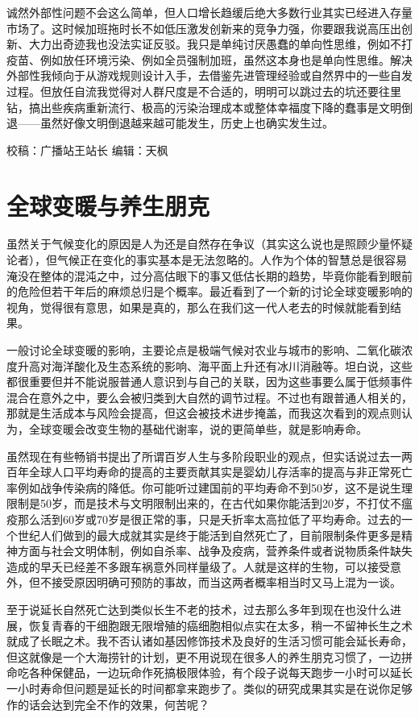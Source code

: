 \documentclass[
]{book}
\begin{document}
诚然外部性问题不会这么简单，但人口增长趋缓后绝大多数行业其实已经进入存量市场了。这时候加班拖时长不如低压激发创新来的竞争力强，你要跟我说高压出创新、大力出奇迹我也没法实证反驳。我只是单纯讨厌愚蠢的单向性思维，例如不打疫苗、例如放任环境污染、例如全员强制加班，虽然这本身也是单向性思维。解决外部性我倾向于从游戏规则设计入手，去借鉴先进管理经验或自然界中的一些自发过程。但放任自流我觉得对人群尺度是不合适的，明明可以跳过去的坑还要往里钻，搞出些疾病重新流行、极高的污染治理成本或整体幸福度下降的蠢事是文明倒退------虽然好像文明倒退越来越可能发生，历史上也确实发生过。

校稿：广播站王站长
编辑：天枫

\hypertarget{ux5168ux7403ux53d8ux6696ux4e0eux517bux751fux670bux514b}{%
\section{全球变暖与养生朋克}\label{ux5168ux7403ux53d8ux6696ux4e0eux517bux751fux670bux514b}}

虽然关于气候变化的原因是人为还是自然存在争议（其实这么说也是照顾少量怀疑论者），但气候正在变化的事实基本是无法忽略的。人作为个体的智慧总是很容易淹没在整体的混沌之中，过分高估眼下的事又低估长期的趋势，毕竟你能看到眼前的危险但若干年后的麻烦总归是个概率。最近看到了一个新的讨论全球变暖影响的视角，觉得很有意思，如果是真的，那么在我们这一代人老去的时候就能看到结果。

一般讨论全球变暖的影响，主要论点是极端气候对农业与城市的影响、二氧化碳浓度升高对海洋酸化及生态系统的影响、海平面上升还有冰川消融等。坦白说，这些都很重要但并不能说服普通人意识到与自己的关联，因为这些事要么属于低频事件混合在意外之中，要么会被归类到大自然的调节过程。不过也有跟普通人相关的，那就是生活成本与风险会提高，但这会被技术进步掩盖，而我这次看到的观点则认为，全球变暖会改变生物的基础代谢率，说的更简单些，就是影响寿命。

虽然现在有些畅销书提出了所谓百岁人生与多阶段职业的观点，但实话说过去一两百年全球人口平均寿命的提高的主要贡献其实是婴幼儿存活率的提高与非正常死亡率例如战争传染病的降低。你可能听过建国前的平均寿命不到50岁，这不是说生理限制是50岁，而是技术与文明限制出来的，在古代如果你能活到20岁，不打仗不瘟疫那么活到60岁或70岁是很正常的事，只是夭折率太高拉低了平均寿命。过去的一个世纪人们做到的最大成就其实是终于能活到自然死亡了，目前限制条件更多是精神方面与社会文明体制，例如自杀率、战争及疫病，营养条件或者说物质条件缺失造成的早夭已经差不多跟车祸意外同样量级了。人就是这样的生物，可以接受意外，但不接受原因明确可预防的事故，而当这两者概率相当时又马上混为一谈。

至于说延长自然死亡达到类似长生不老的技术，过去那么多年到现在也没什么进展，恢复青春的干细胞跟无限增殖的癌细胞相似点实在太多，稍一不留神长生之术就成了长眠之术。我不否认诸如基因修饰技术及良好的生活习惯可能会延长寿命，但这就像是一个大海捞针的计划，更不用说现在很多人的养生朋克习惯了，一边拼命吃各种保健品，一边玩命作死搞极限体验，有个段子说每天跑步一小时可以延长一小时寿命但问题是延长的时间都拿来跑步了。类似的研究成果其实是在说你足够作的话会达到完全不作的效果，何苦呢？
\end{document}

